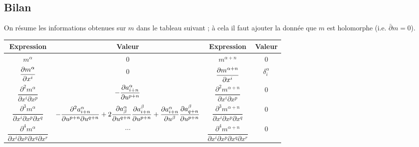 \documentclass[a4paper,draft]{amsart}
\begin{document}
\subsection{Bilan}
On résume les informations obtenues sur $m$ dans le tableau suivant ; à cela il faut ajouter la donnée que $m$ est holomorphe (i.e. $\bar{\partial}m = 0$).
\\%
\begin{tabular}{|c|c||c|c|}
\hline 
Expression & Valeur & Expression & Valeur \\ 
\hline 
\rule[-4ex]{0pt}{8ex}
 $m^\alpha$ & $0$ & $m^{\alpha+n}$ & $0$ \\ 
\hline 
\rule[-4ex]{0pt}{8ex}
 $\dfrac{\partial{m^\alpha}}{\partial{x^i}}$ & $0$ & $\dfrac{\partial{m^{\alpha+n}}}{\partial{x^i}}$ & $\delta^\alpha_i$ \\ 
\hline 
\rule[-4ex]{0pt}{8ex}
 $\dfrac{\partial^2 m^\alpha}{\partial x^i \partial x^p}$ & $-\dfrac{\partial{a^\alpha_{i+n}}}{\partial{u^{p+n}}}$ & $\dfrac{\partial^2 m^{\alpha+n}}{\partial x^i \partial x^p}$ & $0$ \\ 
\hline 
\rule[-4ex]{0pt}{8ex}
 $\dfrac{\partial^3 m^\alpha}{\partial x^i \partial x^p \partial x^q}$ & $-\dfrac{\partial^2 a^\alpha_{i+n}}{\partial u^{p+n} \partial u^{q+n}} + 2\dfrac{\partial{a^\alpha_\beta	}}{\partial{u^{q+n}}}\dfrac{\partial{a^\beta_{i+n}}}{\partial{u^{p+n}}} + \dfrac{\partial{a^\alpha_{i+n}}}{\partial{u^\beta}}\dfrac{\partial{a^\beta_{q+n}}}{\partial{u^{p+n}}}$ & $\dfrac{\partial^3 m^{\alpha+n}}{\partial x^i \partial x^p \partial x^q}$ & $0$ \\ 
\hline 
\rule[-4ex]{0pt}{8ex}
 $\dfrac{\partial^4 m^\alpha}{\partial x^i \partial x^p \partial x^q \partial x^r}$ & $\cdots$ & $\dfrac{\partial^4 m^{\alpha+n}}{\partial x^i \partial x^p \partial x^q \partial x^r}$ & $0$ \\ 
\hline 
\end{tabular} 
\end{document}

